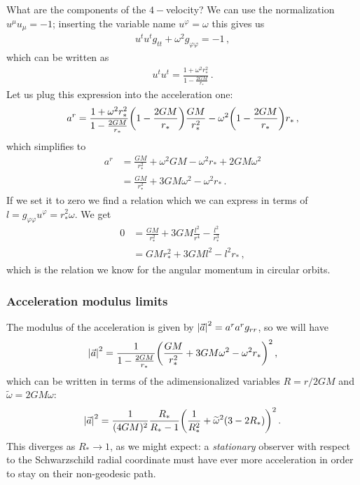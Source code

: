 \documentclass[main.tex]{subfiles}
\begin{document}
What are the components of the \(4-\)velocity? We can use the normalization \(u^{\mu } u_{\mu } = -1\); inserting the variable name \(u^{\varphi } = \omega \) this gives us 
%
\begin{align}
  u^{t} u^{t} g_{tt} + \omega^2 g_{\varphi \varphi } = -1
\,,
\end{align}
%
which can be written as 
%
\begin{align}
  u^{t} u^{t} = \frac{1 + \omega^2 r_{*}^2}{1 - \frac{2GM}{r_*}}
\,.
\end{align}
%
Let us plug this expression into the acceleration one: 
%
\begin{align}
  a^{r} = \frac{1 + \omega^2 r_{*}^2}{1 - \frac{2GM}{r_*}}
  \qty(1 - \frac{2GM}{r_{*}}) \frac{GM}{r_{*}^2} - \omega^2 \qty(1 - \frac{2GM}{r_{*}}) r_{*}
\,,
\end{align}
%
which simplifies to 
%
\begin{align}
  a^{r} &= \frac{GM}{r_{*}^2} + \omega^2 GM - \omega^2 r_{*} + 2GM \omega^2  \\
  &= \frac{GM}{r_{*}^2} + 3GM \omega^2 - \omega^2 r_{*}
\,.
\end{align}
%
If we set it to zero we find a relation which we can express in terms of \(l = g_{\varphi \varphi } u^{\varphi } = r^2_{*} \omega \). We get 
%
\begin{align}
  0 &= \frac{GM}{r_{*}^2} + 3GM \frac{l^2}{r^{4}} - \frac{l^2}{r_{*}^{3}}  \\
  &= GMr_{*}^2 +3GMl^2 - l^2 r_{*}
\,,
\end{align}
%
which  is the relation we know for the angular momentum in circular orbits. 

\subsubsection{Acceleration modulus limits}

The modulus of the acceleration is given by \(\abs{\vec{a}}^2 = a^{r} a^{r} g_{rr}\), so we will have 
%
\begin{align}
  \abs{\vec{a}}^2 = \frac{1}{1- \frac{2GM}{r_{*}}} \qty(
  \frac{GM}{r_{*}^2} + 3GM \omega^2 - \omega^2 r_{*})^2
\,,
\end{align}
%
which can be written in terms of the adimensionalized variables \(R = r / 2GM\) and \(\widetilde{\omega} = 2GM \omega \): 
%
\begin{align}
  \abs{\vec{a}}^2 = \frac{1}{(4GM)^2} \frac{R_{*}}{R_{*} - 1}
  \qty(\frac{1}{R_{*}^2} + \widetilde{\omega}^2 \qty(3 - 2R_{*}))^2
\,.
\end{align}
%
This diverges as \(R_{*} \rightarrow 1\), as we might expect: a \emph{stationary} observer with respect to the Schwarzschild radial coordinate must have ever more acceleration in order to stay on their non-geodesic path. 
\end{document}
